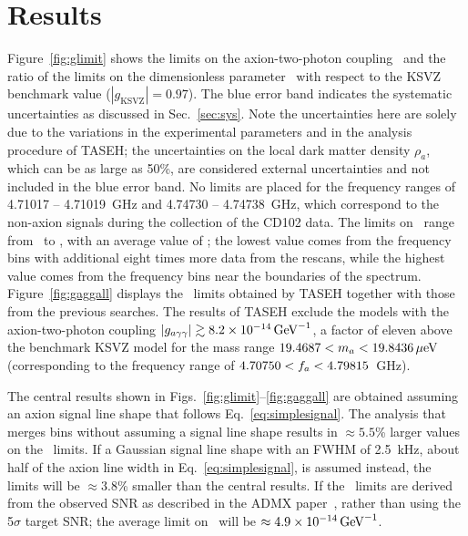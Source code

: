 \section{Results} \label{sec:results}

Figure~\ref{fig:glimit} shows the limits on the axion-two-photon coupling 
\gagg\ and the ratio of the limits on the dimensionless parameter \ggamma\ 
with respect to the KSVZ benchmark value ($\left|g_\text{KSVZ}\right|=0.97$).  
The blue error band indicates the systematic uncertainties as discussed in 
Sec.~\ref{sec:sys}. Note the uncertainties here are solely due to the 
variations in the experimental parameters and in the analysis procedure 
of TASEH; the uncertainties on the local dark matter density $\rho_a$,
 which can be as large as 50\%, are considered external uncertainties 
and not included in the blue error band.  
No limits are placed for the frequency ranges of 
4.71017 -- 4.71019~GHz and 4.74730 -- 4.74738~GHz, which correspond to 
the non-axion signals during the collection of the CD102 data. The limits on 
\gagg\ range from \lolimit\GeVinv\ to \hilimit\GeVinv, with an average 
value of \avelimit\GeVinv; the lowest value comes from the frequency bins with 
additional eight times more data from the rescans, while the highest value 
comes from the frequency bins near the boundaries of the spectrum. 
Figure~\ref{fig:gaggall} displays the \gagg\ limits obtained by TASEH 
together with those from the previous searches. 
The results of TASEH exclude the models with the axion-two-photon coupling 
$\left|g_{a\gamma\gamma}\right|\gtrsim 8.2\times 10^{-14}\,\text{Ge\hspace{-.08em}V}^{-1}$, a factor of eleven above the benchmark
KSVZ model for the mass range $19.4687 < m_a < 19.8436 \,\mu\text{e\hspace{-.08em}V}$ (corresponding to 
the frequency range of $4.70750 < f_a < 4.79815$~GHz). 


The central results shown in Figs.~\ref{fig:glimit}--\ref{fig:gaggall} are 
obtained assuming an axion signal line shape that follows 
Eq.~\eqref{eq:simplesignal}. The analysis that merges bins without 
assuming a signal line shape %
results in $\approx5.5$\% larger values on the 
\gagg\ limits. If a Gaussian signal line shape with an FWHM of 2.5~kHz,  
about half of the axion line width in Eq.~\eqref{eq:simplesignal}, is 
assumed instead, the limits will be $\approx3.8$\% smaller than the central 
results. 
If the \gagg\ limits are derived from the observed SNR as described in the 
ADMX paper~\cite{ADMXVIII}, 
rather than using the 5$\sigma$ target SNR; the average limit on \gagg\ will 
be $\approx4.9\times 10^{-14}\,\text{Ge\hspace{-.08em}V}^{-1}$. 


